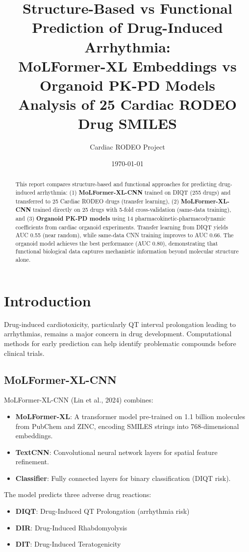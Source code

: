 \documentclass[11pt]{article}
\title{Structure-Based vs Functional Prediction of Drug-Induced Arrhythmia:\\
MoLFormer-XL Embeddings vs Organoid PK-PD Models\\
\large Analysis of 25 Cardiac RODEO Drug SMILES}
\author{Cardiac RODEO Project}
\date{\today}
\begin{document}
\maketitle

\begin{abstract}
This report compares structure-based and functional approaches for predicting drug-induced arrhythmia:
(1) \textbf{MoLFormer-XL-CNN} trained on DIQT (255 drugs) and transferred to 25 Cardiac RODEO drugs (transfer learning),
(2) \textbf{MoLFormer-XL-CNN} trained directly on 25 drugs with 5-fold cross-validation (same-data training), and
(3) \textbf{Organoid PK-PD models} using 14 pharmacokinetic-pharmacodynamic coefficients from cardiac organoid experiments.
Transfer learning from DIQT yields AUC 0.55 (near random), while same-data CNN training improves to AUC 0.66.
The organoid model achieves the best performance (AUC 0.80), demonstrating that functional biological data captures mechanistic information beyond molecular structure alone.
\end{abstract}

\section{Introduction}

Drug-induced cardiotoxicity, particularly QT interval prolongation leading to arrhythmias, remains a major concern in drug development.
Computational methods for early prediction can help identify problematic compounds before clinical trials.

\subsection{MoLFormer-XL-CNN}
MoLFormer-XL-CNN (Lin et al., 2024) combines:
\begin{itemize}
    \item \textbf{MoLFormer-XL}: A transformer model pre-trained on 1.1 billion molecules from PubChem and ZINC, encoding SMILES strings into 768-dimensional embeddings.
    \item \textbf{TextCNN}: Convolutional neural network layers for spatial feature refinement.
    \item \textbf{Classifier}: Fully connected layers for binary classification (DIQT risk).
\end{itemize}

The model predicts three adverse drug reactions:
\begin{itemize}
    \item \textbf{DIQT}: Drug-Induced QT Prolongation (arrhythmia risk)
    \item \textbf{DIR}: Drug-Induced Rhabdomyolysis
    \item \textbf{DIT}: Drug-Induced Teratogenicity
\end{itemize}
\end{document}
